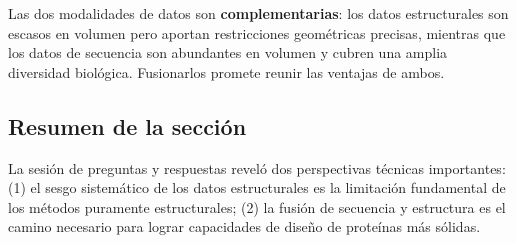Las dos modalidades de datos son \textbf{complementarias}: los datos estructurales son escasos en volumen pero aportan restricciones geométricas precisas, mientras que los datos de secuencia son abundantes en volumen y cubren una amplia diversidad biológica. Fusionarlos promete reunir las ventajas de ambos.

\subsection{Resumen de la sección}

La sesión de preguntas y respuestas reveló dos perspectivas técnicas importantes: (1) el sesgo sistemático de los datos estructurales es la limitación fundamental de los métodos puramente estructurales; (2) la fusión de secuencia y estructura es el camino necesario para lograr capacidades de diseño de proteínas más sólidas.

